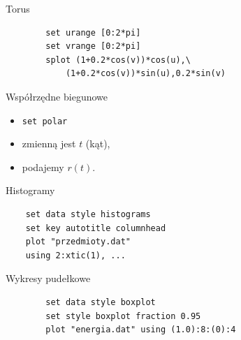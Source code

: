 \documentclass{beamer}
\begin{document}
\begin{frame}[containsverbatim]{Torus}
    \begin{verbatim}
        set urange [0:2*pi]
        set vrange [0:2*pi]
        splot (1+0.2*cos(v))*cos(u),\
            (1+0.2*cos(v))*sin(u),0.2*sin(v)
    \end{verbatim}
\end{frame}
\begin{frame}{Współrzędne biegunowe}
   \begin{itemize}
       \item \texttt{set polar}
       \item zmienną jest $t$ (kąt),
       \item podajemy $r(t).$
   \end{itemize}
\end{frame}
\begin{frame}[containsverbatim]{Histogramy}
\begin{verbatim}
    set data style histograms
    set key autotitle columnhead
    plot "przedmioty.dat" 
    using 2:xtic(1), ...
\end{verbatim}
\end{frame}
\begin{frame}[containsverbatim]{Wykresy pudełkowe}

    \begin{verbatim}
        set data style boxplot
        set style boxplot fraction 0.95
        plot "energia.dat" using (1.0):8:(0):4
    \end{verbatim}

\end{frame}
\end{document}
